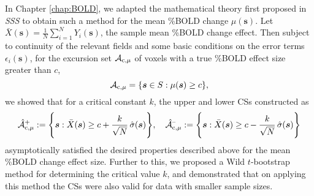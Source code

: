 In Chapter \ref{chap:BOLD}, we adapted the mathematical theory first proposed in \textit{SSS} to obtain such a method for the mean \%BOLD change $\mu(\bm{s})$. Let $\bar{X}(\bm{s}) = \frac{1}{N}\sum_{i=1}^{N} Y_{i}(\bm{s})$, the sample mean \%BOLD change effect. Then subject to continuity of the relevant fields and some basic conditions on the error terms $\epsilon_{i}(\bm{s})$, for the excursion set $\operatorname{\mathcal{A}_{c,\mu}}$ of voxels with a true \%BOLD effect size greater than $c$,
\begin{equation}
\label{eq:mu_excursion}
\operatorname{\mathcal{A}_{c,\mu}} = \{\bm{s} \in S : \mu(\bm{s})\geq c \},
\end{equation}
we showed that for a critical constant $k$, the upper and lower CSs constructed as 
\begin{equation}
\label{eq:mu_CSs}
\operatorname{\hat{\mathcal{A}}_{c,\mu}^+} := \Bigg\{\bm{s} : \bar{X}(\bm{s}) \geq c + \frac{k}{\sqrt{N}}\, \hat{\sigma}(\bm{s}) \Bigg\}, \quad \operatorname{\hat{\mathcal{A}}_{c,\mu}^{\textrm{--}}} := \Bigg\{\bm{s} : \bar{X}(\bm{s}) \geq c - \frac{k}{{\sqrt{N}}} \,\hat{\sigma}(\bm{s}) \Bigg\}
\end{equation}
 asymptotically satisfied the desired properties described above for the mean \%BOLD change effect size. Further to this, we proposed a Wild $t$-bootstrap method for determining the critical value $k$, and demonstrated that on applying this method the CSs were also valid for data with smaller sample sizes.

